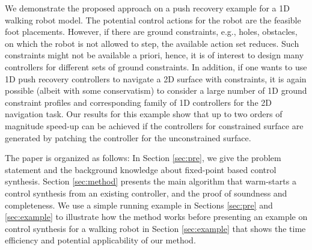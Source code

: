







We demonstrate the proposed approach on a push recovery example for a 1D walking robot model. The potential control actions for the robot are the feasible foot placements. However, if there are ground constraints, e.g., holes, obstacles, on which the robot is not allowed to step, the available action set reduces. Such constraints might not be available a priori, hence, it is of interest to design many controllers for different sets of ground constraints. In addition, if one wants to use 1D push recovery controllers to navigate a 2D surface with constraints, it is again possible (albeit with some conservatism) to consider a large number of 1D ground constraint profiles and corresponding family of 1D controllers for the 2D navigation task. Our results for this example show that up to  two orders of magnitude speed-up can be achieved if the controllers for constrained surface are generated by patching the controller for the unconstrained surface.  



The paper is organized as follows: In Section \ref{sec:pre}, we give the problem statement and the background knowledge about fixed-point based control synthesis. Section \ref{sec:method} presents the main algorithm that warm-starts a control synthesis from an existing controller, and the proof of soundness and completeness. We use a simple running example in Sections \ref{sec:pre} and \ref{sec:example} to illustrate how the method works before presenting an example on control synthesis for a  walking robot in Section \ref{sec:example} that shows the time efficiency and potential applicability of our method.

